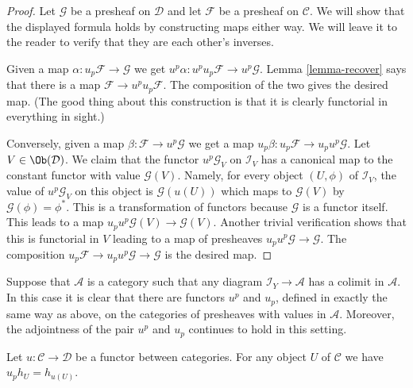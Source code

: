\begin{proof}
Let $\mathcal{G}$ be a presheaf on $\mathcal{D}$ and let
$\mathcal{F}$ be a presheaf on $\mathcal{C}$.
We will show that the displayed formula holds
by constructing maps either way. We will leave
it to the reader to verify that they are each other's inverses.

\medskip\noindent
Given a map $\alpha : u_p \mathcal{F} \to \mathcal{G}$
we get $u^p\alpha : u^p u_p \mathcal{F} \to u^p \mathcal{G}$.
Lemma \ref{lemma-recover} says that there is a
map $\mathcal{F} \to u^p u_p \mathcal{F}$. The composition
of the two gives the desired map. (The good thing about this construction
is that it is clearly functorial in everything in sight.)

\medskip\noindent
Conversely, given a map $\beta : \mathcal{F} \to u^p\mathcal{G}$
we get a map $u_p\beta : u_p\mathcal{F} \to u_p u^p\mathcal{G}$.
Let $V \in \Ob(\mathcal{D})$.
We claim that the functor $u^p\mathcal{G}_V$ on $\mathcal{I}_V$
has a canonical map to the constant functor with value $\mathcal{G}(V)$.
Namely, for every object $(U, \phi)$ of $\mathcal{I}_V$,
the value of $u^p\mathcal{G}_V$ on this object is $\mathcal{G}(u(U))$
which maps to $\mathcal{G}(V)$ by $\mathcal{G}(\phi) = \phi^*$.
This is a transformation of functors because $\mathcal{G}$ is a functor
itself. This leads to a map $u_p u^p \mathcal{G}(V) \to \mathcal{G}(V)$.
Another trivial verification shows that this is functorial in $V$
leading to a map of presheaves $u_p u^p \mathcal{G} \to \mathcal{G}$.
The composition $u_p\mathcal{F} \to u_p u^p\mathcal{G} \to
\mathcal{G}$ is the desired map.
\end{proof}

\begin{remark}
\label{remark-functoriality-presheaves-values}
Suppose that $\mathcal{A}$ is a category such that
any diagram $\mathcal{I}_Y \to \mathcal{A}$ has a
colimit in $\mathcal{A}$. In this case it is clear
that there are functors $u^p$ and $u_p$, defined in
exactly the same way as above, on the categories
of presheaves with values in $\mathcal{A}$.
Moreover, the adjointness of the pair
$u^p$ and $u_p$ continues to hold in this setting.
\end{remark}

\begin{lemma}
\label{lemma-pullback-representable-presheaf}
Let $u : \mathcal{C} \to \mathcal{D}$ be a functor between categories.
For any object $U$ of $\mathcal{C}$ we have $u_ph_U = h_{u(U)}$.
\end{lemma}

